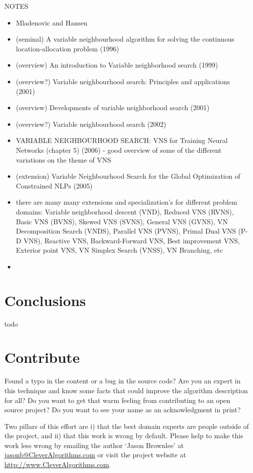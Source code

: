 \documentclass[a4paper, 11pt]{article}
\makeatletter
\newcommand{\myreportauthor}{Jason Brownlee}
\newcommand{\myreportemail}{jasonb@CleverAlgorithms.com}
\newcommand{\myreportwebsite}{http://www.CleverAlgorithms.com}
\makeatother
\begin{document}
NOTES

\begin{itemize}
	\item Mladenovic and Hansen
	\item (seminal) A variable neighbourhood algorithm for solving the continuous location-allocation problem (1996)
	\item (overview) An introduction to Variable neighborhood search (1999)
	\item (overview?) Variable neighbourhood search: Principles and applications (2001)
	\item (overview) Developments of variable neighborhood search (2001)
	\item (overview?) Variable neighbourhood search (2002)
\end{itemize}

\begin{itemize}
	\item VARIABLE NEIGHBOURHOOD SEARCH: VNS for Training Neural Networks (chapter 5) (2006) - good overview of some of the different variations on the theme of VNS
	\item (extension) Variable Neighbourhood Search for the Global Optimization of Constrained NLPs (2005)
	\item there are many many extensions and specialization's for different problem domains: Variable neighborhood descent (VND), Reduced VNS (RVNS), Basic VNS (BVNS), Skewed VNS (SVNS), General VNS (GVNS), VN Decomposition Search (VNDS), Parallel VNS (PVNS), Primal Dual VNS (P-D VNS), Reactive VNS, Backward-Forward VNS, Best improvement VNS, Exterior point VNS, VN Simplex Search (VNSS), VN Branching, etc
	\item
\end{itemize}


% 
% 
\section{Conclusions}
\label{sec:conclusions}
todo

% 
% 
\section{Contribute}
\label{sec:contribute}
Found a typo in the content or a bug in the source code? 
Are you an expert in this technique and know some facts that could improve the algorithm description for all?
Do you want to get that warm feeling from contributing to an open source project? 
Do you want to see your name as an acknowledgment in print?

Two pillars of this effort are i) that the best domain experts are people outside of the project, and ii) that this work is wrong by default. 
Please help to make this work less wrong by emailing the author `\myreportauthor' at \url{\myreportemail} or visit the project website at \url{\myreportwebsite}.



\end{document}
